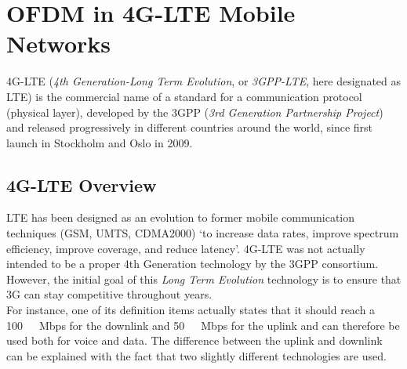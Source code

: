 \chapter{OFDM in 4G-LTE Mobile Networks}

\indent 4G-LTE (\textit{4th Generation-Long Term Evolution}, or \textit{3GPP-LTE}, here designated as LTE) is the commercial name of a standard for a communication protocol (physical layer), developed by the 3GPP (\textit{3rd Generation Partnership Project}) and released progressively in different countries around the world, since first launch in Stockholm and Oslo in 2009.

\section{4G-LTE Overview}
%
\indent LTE has been designed as an evolution to former mobile communication techniques (GSM, UMTS, CDMA2000) `to increase 
data rates, improve spectrum efficiency, improve coverage, and reduce latency'\cite{EDahlman}. 4G-LTE was not actually intended to be a proper 4th Generation technology by the 3GPP consortium. However, the initial goal of this \textit{Long Term Evolution} technology is to ensure that 3G can stay competitive throughout years.\\
\indent For instance, one of its definition items actually states that it should reach a \si{100\ Mbps} for the downlink and \si{50\ Mbps} for the uplink and can therefore be used both for voice and data. The difference between the uplink and downlink can be explained with the fact that two slightly different technologies are used.

